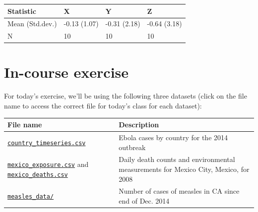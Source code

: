 \documentclass[]{book}
\theoremstyle{definition}
\theoremstyle{definition}
\theoremstyle{definition}
\theoremstyle{remark}
\begin{document}
\begin{tabular}{l|l|l|l}
\hline
Statistic & X & Y & Z\\
\hline
Mean (Std.dev.) & -0.13 (1.07) & -0.31 (2.18) & -0.64 (3.18)\\
\hline
N & 10 & 10 & 10\\
\hline
\end{tabular}

\section{In-course exercise}\label{in-course-exercise-5}

For today's exercise, we'll be using the following three datasets (click
on the file name to access the correct file for today's class for each
dataset):

\begin{longtable}[]{@{}ll@{}}
\toprule
\begin{minipage}[b]{0.27\columnwidth}\raggedright\strut
File name\strut
\end{minipage} & \begin{minipage}[b]{0.63\columnwidth}\raggedright\strut
Description\strut
\end{minipage}\tabularnewline
\midrule
\endhead
\begin{minipage}[t]{0.27\columnwidth}\raggedright\strut
\href{https://github.com/geanders/RProgrammingForResearch/raw/master/data/country_timeseries.csv}{\texttt{country\_timeseries.csv}}\strut
\end{minipage} & \begin{minipage}[t]{0.63\columnwidth}\raggedright\strut
Ebola cases by country for the 2014 outbreak\strut
\end{minipage}\tabularnewline
\begin{minipage}[t]{0.27\columnwidth}\raggedright\strut
\href{https://github.com/geanders/RProgrammingForResearch/raw/master/data/mexico_exposure.csv}{\texttt{mexico\_exposure.csv}}
and
\href{https://github.com/geanders/RProgrammingForResearch/raw/master/data/mexico_deaths.csv}{\texttt{mexico\_deaths.csv}}\strut
\end{minipage} & \begin{minipage}[t]{0.63\columnwidth}\raggedright\strut
Daily death counts and environmental measurements for Mexico City,
Mexico, for 2008\strut
\end{minipage}\tabularnewline
\begin{minipage}[t]{0.27\columnwidth}\raggedright\strut
\href{https://github.com/geanders/RProgrammingForResearch/tree/master/data/measles_data}{\texttt{measles\_data/}}\strut
\end{minipage} & \begin{minipage}[t]{0.63\columnwidth}\raggedright\strut
Number of cases of measles in CA since end of Dec. 2014\strut
\end{minipage}\tabularnewline
\bottomrule
\end{longtable}
\end{document}
